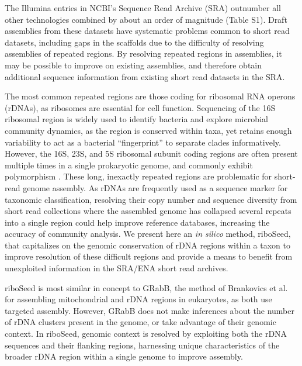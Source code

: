 \documentclass[a4,center,fleqn]{NAR}
\begin{document}
The Illumina entries in NCBI's Sequence Read Archive (SRA) \cite{Kodama2012a} outnumber all other technologies combined by about an order of magnitude (Table S1). Draft assemblies from these datasets have systematic problems common to short read datasets, including gaps in the scaffolds due to the difficulty of resolving assemblies of repeated regions\cite{Whiteford2005,Treangen2011}. By resolving repeated regions in assemblies, it may be possible to improve on existing assemblies, and therefore obtain additional sequence information from existing short read datasets in the SRA.



The most common repeated regions are those coding for ribosomal RNA operons (rDNAs), as ribosomes are essential for cell function. Sequencing of the 16S ribosomal region is widely used to identify bacteria and explore microbial community dynamics\cite{Weisburg1991,Clarridge2004,Woese1990,Case2007}, as the region is conserved within taxa, yet retains enough variability to act as a bacterial ``fingerprint'' to separate clades informatively. However, the 16S, 23S, and 5S ribosomal subunit coding regions are often present multiple times in a single prokaryotic genome, and commonly exhibit polymorphism \cite{Coenye2003,Moreno2002,Lukjancenko2010,Vetrovsky2013}. These long, inexactly repeated regions\cite{Alkan2011} are problematic for short-read genome assembly. As rDNAs are frequently used as a sequence marker for taxonomic classification, resolving their copy number and sequence diversity from short read collections where the assembled genome has collapsed several repeats into a single region could help improve reference databases, increasing the accuracy of community analysis. We present here an \textit{in silico} method, riboSeed, that capitalizes on the genomic conservation of rDNA regions within a taxon to improve resolution of these difficult regions and provide a means to benefit from unexploited information in the SRA/ENA short read archives.


riboSeed is most similar in concept to GRabB, the method of Brankovics et al. \cite{Brankovics2016} for assembling mitochondrial and rDNA regions in eukaryotes, as both use targeted assembly. However, GRabB does not make inferences about the number of rDNA clusters present in the genome, or take advantage of their genomic context. In riboSeed, genomic context is resolved by exploiting both the rDNA sequences and their flanking regions, harnessing unique characteristics of the broader rDNA region within a single genome to improve assembly.
\end{document}
